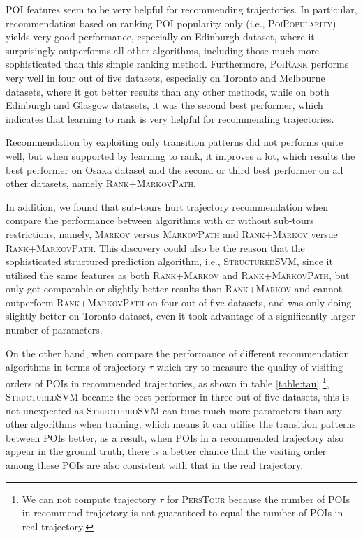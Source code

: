 POI features seem to be very helpful for recommending trajectories.
In particular, recommendation based on ranking POI popularity only 
(i.e., \textsc{PoiPopularity}) yields very good performance,
especially on Edinburgh dataset, where it surprisingly outperforms all 
other algorithms, including those much more sophisticated than this simple ranking method.
%
Furthermore, \textsc{PoiRank} performs very well in four out of five datasets, 
especially on Toronto and Melbourne datasets, where it got better results than any other methods, 
while on both Edinburgh and Glasgow datasets, it was the second best performer, 
which indicates that learning to rank is very helpful for recommending trajectories.

Recommendation by exploiting only transition patterns did not performs quite well,
but when supported by learning to rank, it improves a lot, which results the best performer on Osaka dataset 
and the second or third best performer on all other datasets, namely \textsc{Rank+MarkovPath}.

In addition, we found that sub-tours hurt trajectory recommendation when compare the performance between
algorithms with or without sub-tours restrictions, namely, \textsc{Markov} versus \textsc{MarkovPath} and 
\textsc{Rank+Markov} versue \textsc{Rank+MarkovPath}.
% 
This discovery could also be the reason that the sophisticated structured prediction algorithm, 
i.e., \textsc{StructuredSVM}, since it utilised the same features as both \textsc{Rank+Markov} and 
\textsc{Rank+MarkovPath}, but only got comparable or slightly better results than \textsc{Rank+Markov} 
and cannot outperform \textsc{Rank+MarkovPath} on four out of five datasets, and was only doing slightly 
better on Toronto dataset, even it took advantage of a significantly larger number of parameters.

On the other hand, when compare the performance of different recommendation algorithms in terms of trajectory $\tau$
which try to measure the quality of visiting orders of POIs in recommended trajectories,
as shown in table \ref{table:tau}
\footnote{We can not compute trajectory $\tau$ for \textsc{PersTour} because the number of POIs in recommend trajectory 
is not guaranteed to equal the number of POIs in real trajectory.},
\textsc{StructuredSVM} became the best performer in three out of five datasets,
this is not unexpected as \textsc{StructuredSVM} can tune much more parameters than any other algorithms when training,
which means it can utilise the transition patterns between POIs better,
as a result, when POIs in a recommended trajectory also appear in the ground truth, 
there is a better chance that the visiting order among these POIs are also consistent with 
that in the real trajectory.

